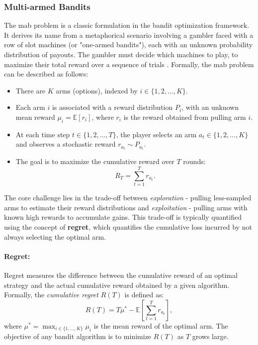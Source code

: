 \subsubsection{Multi-armed Bandits}
The \ac{mab} problem is a classic formulation in the bandit optimization framework. It derives its name from a metaphorical scenario involving a gambler faced with a row of slot machines (or "one-armed bandits"), each with an unknown probability distribution of payouts. The gambler must decide which machines to play, to maximize their total reward over a sequence of trials \citep{robbins1952some}. Formally, the \ac{mab} problem can be described as follows:
\begin{itemize}
    \item There are $K$ arms (options), indexed by $i \in \{1, 2, \ldots, K\}$.
    \item Each arm $i$ is associated with a reward distribution $P_i$, with an unknown mean reward $\mu_i = \mathbb{E}[r_i]$, where $r_i$ is the reward obtained from pulling arm $i$.
    \item At each time step $t \in \{1, 2, \ldots, T\}$, the player selects an arm $a_t \in \{1, 2, \ldots, K\}$ and observes a stochastic reward $r_{a_t} \sim P_{a_t}$.
    \item The goal is to maximize the cumulative reward over $T$ rounds:
    \begin{equation*}
        R_T = \sum_{t=1}^T r_{a_t}.
    \end{equation*}
\end{itemize}

The core challenge lies in the trade-off between \textit{exploration} - pulling less-sampled arms to estimate their reward distributions and \textit{exploitation} - pulling arms with known high rewards to accumulate gains. This trade-off is typically quantified using the concept of \textbf{regret}, which quantifies the cumulative loss incurred by not always selecting the optimal arm.

\paragraph{Regret:}
Regret measures the difference between the cumulative reward of an optimal strategy and the actual cumulative reward obtained by a given algorithm. Formally, the \textit{cumulative regret} $R(T)$ is defined as:
\begin{equation*}
    R(T) = T \mu^* - \mathbb{E}\left[\sum_{t=1}^T r_{a_t}\right],
\end{equation*}
where $\mu^* = \max_{i \in \{1, \ldots, K\}} \mu_i$ is the mean reward of the optimal arm. The objective of any bandit algorithm is to minimize $R(T)$ as $T$ grows large.

